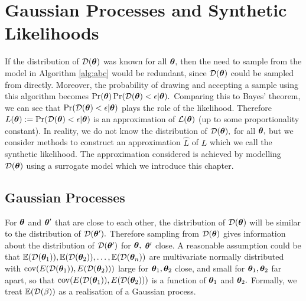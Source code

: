 \chapter{Gaussian Processes and Synthetic Likelihoods}

If the distribution of $\mathcal{D}(\bm{\theta})$ was known for all $\bm{\theta},$ then the need
to sample from the model in Algorithm
\ref{alg:abc} would be redundant, since $\mathcal{D}(\bm{\theta})$ could be sampled from
directly. Moreover, the probability of drawing and accepting a sample
using this algorithm becomes
$\Pr(\bm{\theta})\Pr(\mathcal{D}(\bm{\theta}) < \epsilon | \bm{\theta}).$ Comparing
this to Bayes' theorem, we can see that $\Pr(\mathcal{D}(\bm{\theta}) < \epsilon | \bm{\theta})$
plays the role of the likelihood. Therefore
$L(\bm{\theta}) := \Pr(\mathcal{D}(\bm{\theta}) < \epsilon | \bm{\theta})$
is an approximation of $\operatorname{\mathcal{L}}(\bm{\theta})$ (up to some proportionality constant).
In reality, we do not know the distribution of $\mathcal{D}(\bm{\theta}),$ for all
$\bm{\theta},$ but we consider methods to construct
an approximation $\hat{L}$ of $L$ which we call the synthetic likelihood.
The approximation considered is achieved by modelling
$\mathcal{D}(\bm{\theta})$ using a surrogate model which we introduce this chapter.

\section{Gaussian Processes}

For $\bm{\theta}$ and $\bm{\theta}^\prime$ that are close to each other,
the distribution of $\mathcal{D}(\bm{\theta})$ will be similar to the distribution of
$\mathcal{D}(\bm{\theta}^\prime).$ Therefore sampling from $\mathcal{D}(\bm{\theta})$ gives information
about the distribution of $\mathcal{D}(\bm{\theta}^\prime)$ for $\bm{\theta},$
$\bm{\theta}^\prime$ close. A reasonable assumption could be that
$\operatorname{\mathbb{E}}(\mathcal{D}(\bm{\theta}_1)), \operatorname{\mathbb{E}}(\mathcal{D}(\bm{\theta}_2)), \dots, \operatorname{\mathbb{E}}(\mathcal{D}(\bm{\theta}_n))$ are
multivariate
normally distributed with $\operatorname{cov}(E(\mathcal{D}(\bm{\theta}_1)), E(\mathcal{D}(\bm{\theta}_2)))$ large for
$\bm{\theta}_1, \bm{\theta}_2$ close, and small for $\bm{\theta}_1, \bm{\theta}_2$ far apart,
so that $\operatorname{cov}(E(\mathcal{D}(\bm{\theta}_1)), E(\mathcal{D}(\bm{\theta}_2)))$ is a function of $\bm{\theta}_1$
and $\bm{\theta}_2.$
Formally, we treat $\operatorname{\mathbb{E}}(\mathcal{D}(\beta))$ as a realisation of a Gaussian process.

